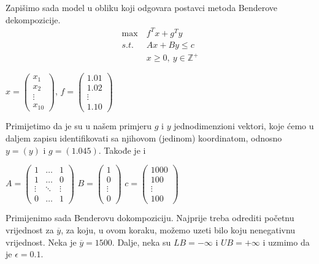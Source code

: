 \documentclass[a4paper, utf8, 11pt, colorlinks]{book}
\begin{document}
Zapišimo sada model u obliku koji odgovara postavci metoda Benderove dekompozicije.
 \begin{equation}\label{primer:formulacija2}
	\begin{aligned}
		\max\  &f^Tx+g^Ty\\
		s.t.\  &Ax+By\leqslant c\\
		&x\geqslant 0,\ y \in \mathbb{Z}^+
	\end{aligned}
\end{equation}


$x=\left(\begin{array}{c}
	x_1 \\
	x_2 \\
	\vdots \\
	x_10
\end{array}\right)$,  
$f = \left(\begin{array}{c}
	1.01 \\
	1.02 \\
	\vdots \\
	1.10
\end{array}\right)$

Primijetimo da je su u našem primjeru $g$ i $y$ jednodimenzioni vektori, koje ćemo u daljem zapisu identifikovati sa njihovom (jedinom) koordinatom, odnosno
$y=(y)$ i $g=(1.045)$. Takođe je i 

$A=\left(
\begin{array}{ccc}
	1 & \ldots & 1 \\
	1 & \ldots & 0 \\
	\vdots & \ddots & \vdots \\
	0 & \ldots & 1
\end{array}\right)$
$B=\left(\begin{array}{c}
	1 \\
	0 \\
	\vdots \\
	0
\end{array}\right)$ 
$c=\left(\begin{array}{c}
	1000 \\
	100 \\
	\vdots \\
	100
\end{array}\right)$ 


Primijenimo sada Benderovu dokompoziciju. Najprije treba odrediti početnu vrijednost za $\overline{y}$, za koju, u ovom koraku, možemo uzeti bilo koju nenegativnu vrijednost. Neka je $\overline{y}=1500$. Dalje, neka su $LB=-\infty$ i $UB=+\infty$ i uzmimo da je $\epsilon = 0.1$.
\end{document}
